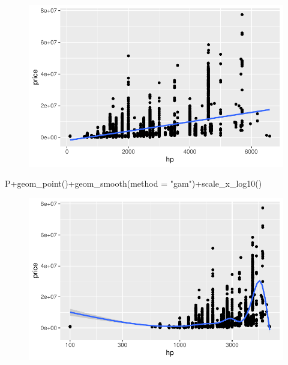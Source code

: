 \documentclass[
  letterpaper,
  DIV=11,
  numbers=noendperiod]{scrartcl}
\newenvironment{Shaded}{\begin{snugshade}}{\end{snugshade}}
\newcommand{\AttributeTok}[1]{\textcolor[rgb]{0.40,0.45,0.13}{#1}}
\newcommand{\FunctionTok}[1]{\textcolor[rgb]{0.28,0.35,0.67}{#1}}
\newcommand{\NormalTok}[1]{\textcolor[rgb]{0.00,0.23,0.31}{#1}}
\newcommand{\SpecialCharTok}[1]{\textcolor[rgb]{0.37,0.37,0.37}{#1}}
\newcommand{\StringTok}[1]{\textcolor[rgb]{0.13,0.47,0.30}{#1}}
\begin{document}
\begin{figure}[H]

{\centering \includegraphics[width=17.1875in,height=\textheight]{pakwheels_files/figure-pdf/unnamed-chunk-29-2.pdf}

}

\end{figure}

\begin{Shaded}
\begin{Highlighting}[]

\NormalTok{P}\SpecialCharTok{+}\FunctionTok{geom\_point}\NormalTok{()}\SpecialCharTok{+}\FunctionTok{geom\_smooth}\NormalTok{(}\AttributeTok{method =} \StringTok{"gam"}\NormalTok{)}\SpecialCharTok{+}\FunctionTok{scale\_x\_log10}\NormalTok{()}
\end{Highlighting}
\end{Shaded}

\begin{figure}[H]

{\centering \includegraphics[width=17.1875in,height=\textheight]{pakwheels_files/figure-pdf/unnamed-chunk-29-3.pdf}

}

\end{figure}
\end{document}
